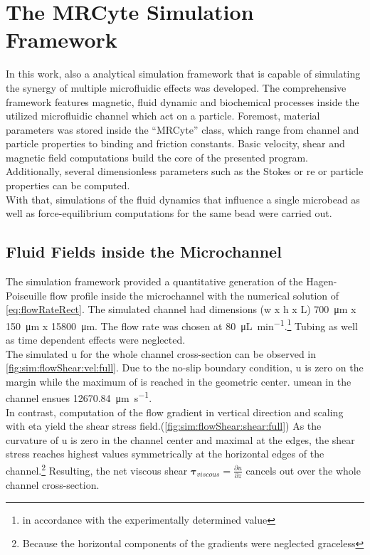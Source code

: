 \section{The MRCyte Simulation Framework}
In this work, also a analytical simulation framework that is capable of simulating the synergy of multiple microfluidic effects was developed. The comprehensive framework features magnetic, fluid dynamic and biochemical processes inside the utilized microfluidic channel which act on a particle. Foremost, material parameters was stored inside the ``MRCyte'' class, which range from channel and particle properties to binding and friction constants. Basic velocity, shear and magnetic field computations build the core of the presented program. Additionally, several dimensionless parameters such as the Stokes or \gls{re} or particle properties can be computed.\\
With that, simulations of the fluid dynamics that influence a single microbead as well as force-equilibrium computations for the same bead were carried out. 


\subsection{Fluid Fields inside the Microchannel}
\label{sec:res:fluidSim}
The simulation framework provided a quantitative generation of the Hagen-Poiseuille flow profile inside the microchannel with the numerical solution of \cref{eq:flowRateRect}. The simulated channel had dimensions (w x h x L) \SI{700}{\micro\meter} x \SI{150}{\micro\meter} x \SI{15800}{\micro\meter}. The flow rate was chosen at \SI{80}{\micro\liter\per\minute}.\footnote{in accordance with the experimentally determined value} Tubing as well as time dependent effects were neglected. \\
The simulated \acrfull{u} for the whole channel cross-section can be observed in \cref{fig:sim:flowShear:vel:full}. Due to the no-slip boundary condition, \gls{u} is zero on the margin while the maximum of is reached in the geometric center. \gls{umean} in the channel ensues \SI{12670.84}{\micro\meter\per\second}. \\
In contrast, computation of the flow gradient in vertical direction and scaling with \gls{eta} yield the shear stress field.(\cref{fig:sim:flowShear:shear:full}) As the curvature of \gls{u} is zero in the channel center and maximal at the edges, the shear stress reaches highest values symmetrically at the horizontal edges of the channel.\footnote{Because the horizontal components of the gradients were neglected graceless} Resulting, the net viscous shear $\boldsymbol{\tau}_{viscous} = \frac{\partial u}{\partial z}$ cancels out over the whole channel cross-section.

